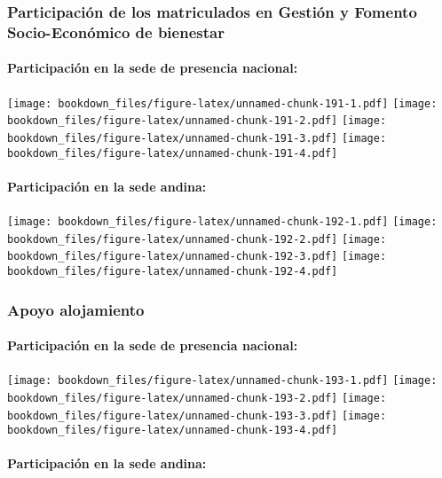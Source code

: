 \documentclass[]{article}
\let\oldparagraph\paragraph
\renewcommand{\paragraph}[1]{\oldparagraph{#1}\mbox{}}
\theoremstyle{definition}
\theoremstyle{definition}
\theoremstyle{definition}
\theoremstyle{remark}
\begin{document}
\subsubsection{Participación de los matriculados en Gestión y Fomento
Socio-Económico de
bienestar}\label{participacion-de-los-matriculados-en-gestion-y-fomento-socio-economico-de-bienestar-1}

\paragraph{Participación en la sede de presencia
nacional:}\label{participacion-en-la-sede-de-presencia-nacional-8}

\texttt{[image: bookdown\_files/figure-latex/unnamed-chunk-191-1.pdf]}
\texttt{[image: bookdown\_files/figure-latex/unnamed-chunk-191-2.pdf]}
\texttt{[image: bookdown\_files/figure-latex/unnamed-chunk-191-3.pdf]}
\texttt{[image: bookdown\_files/figure-latex/unnamed-chunk-191-4.pdf]}

\paragraph{Participación en la sede
andina:}\label{participacion-en-la-sede-andina-8}

\texttt{[image: bookdown\_files/figure-latex/unnamed-chunk-192-1.pdf]}
\texttt{[image: bookdown\_files/figure-latex/unnamed-chunk-192-2.pdf]}
\texttt{[image: bookdown\_files/figure-latex/unnamed-chunk-192-3.pdf]}
\texttt{[image: bookdown\_files/figure-latex/unnamed-chunk-192-4.pdf]}

\subsubsection{Apoyo alojamiento}\label{apoyo-alojamiento-1}

\paragraph{Participación en la sede de presencia
nacional:}\label{participacion-en-la-sede-de-presencia-nacional-9}

\texttt{[image: bookdown\_files/figure-latex/unnamed-chunk-193-1.pdf]}
\texttt{[image: bookdown\_files/figure-latex/unnamed-chunk-193-2.pdf]}
\texttt{[image: bookdown\_files/figure-latex/unnamed-chunk-193-3.pdf]}
\texttt{[image: bookdown\_files/figure-latex/unnamed-chunk-193-4.pdf]}

\paragraph{Participación en la sede
andina:}\label{participacion-en-la-sede-andina-9}
\end{document}
